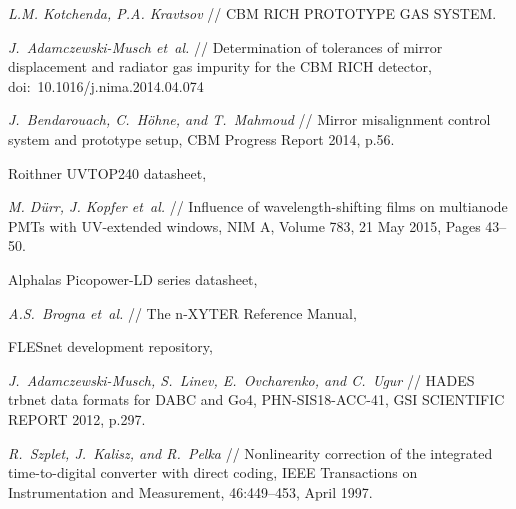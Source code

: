 \begin{thebibliography}{99}
\textit{L.M. Kotchenda, P.A. Kravtsov} //
CBM RICH PROTOTYPE GAS SYSTEM.

\textit{J.~Adamczewski-Musch et~al.} //
Determination of tolerances of mirror displacement and radiator gas impurity for the CBM RICH detector,
doi:~10.1016/j.nima.2014.04.074

\textit{J.~Bendarouach, C.~H\"{o}hne, and T.~Mahmoud} //
Mirror misalignment control system and prototype setup,
CBM Progress Report 2014, p.56.

Roithner UVTOP240 datasheet,

\textit{M. D\"{u}rr, J. Kopfer et~al.} //
Influence of wavelength-shifting films on multianode PMTs with UV-extended windows,
NIM A, Volume 783, 21 May 2015, Pages 43–50.

Alphalas Picopower-LD series datasheet,


\textit{A.S.~Brogna et~al.} //
The n-XYTER Reference Manual,


FLESnet development repository,

\textit{J.~Adamczewski-Musch, S.~Linev, E.~Ovcharenko, and C.~Ugur} //
HADES trbnet data formats for DABC and Go4,
PHN-SIS18-ACC-41, GSI SCIENTIFIC REPORT 2012, p.297.

\textit{R.~Szplet, J.~Kalisz, and R.~Pelka} //
Nonlinearity correction of the integrated time-to-digital converter with direct coding,
IEEE Transactions on Instrumentation and Measurement, 46:449–453, April 1997.


\end{thebibliography}
